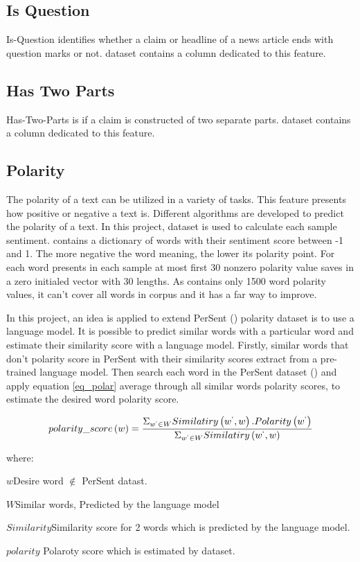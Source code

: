 \subsection{Is Question}
Is-Question identifies whether a claim or headline of a news article ends with question marks or not. \cite{stance_persian} dataset contains a column dedicated to this feature.
\subsection{Has Two Parts}
Has-Two-Parts is if a claim is constructed of two separate parts. \cite{stance_persian} dataset contains a column dedicated to this feature.
\subsection{Polarity}  
The polarity of a text can be utilized in a variety of tasks. This feature presents how positive or negative a text is. Different algorithms are developed to predict the polarity of a text. In this project, \cite{persent} dataset is used to calculate each sample sentiment. \cite{persent} contains a dictionary of words with their sentiment score between -1 and 1. The more negative the word meaning, the lower its polarity point. For each word presents in each sample at most first 30 nonzero polarity value saves in a zero initialed vector with 30 lengths. As \cite{persent} contains only 1500 word polarity values, it can't cover all words in corpus and it has a far way to improve. 

In this project, an idea is applied to extend PerSent (\cite{persent}) polarity dataset is to use a language model. It is possible to predict similar words with a particular word and estimate their similarity score with a language model. Firstly, similar words that don't polarity score in PerSent with their similarity scores extract from a pre-trained language model. Then search each word in the PerSent dataset (\cite{persent}) and apply equation \ref{eq_polar} average through all similar words polarity scores, to estimate the desired word polarity score.

\begin{equation}
	\label{eq_polar}
	polarity\_score\left(w\right) = \frac{\Sigma_{w^{`} \in W} Similatiry\left(w^{`}, w\right) . Polarity\left(w^{`}\right)}{\Sigma_{w^{`} \in W} Similatiry\left(w^{`}, w\right)}
\end{equation}

where: 
\begin{eqexpl}[25mm]
	\item{$w$}Desire word $\notin$ PerSent datast.
	\item{$W$}Similar words, Predicted by the language model
	\item{$Similarity$}Similarity score for 2 words which is predicted by the language model.
	\item{$polarity$} Polaroty score which is estimated by \cite{persent} dataset.
\end{eqexpl}

